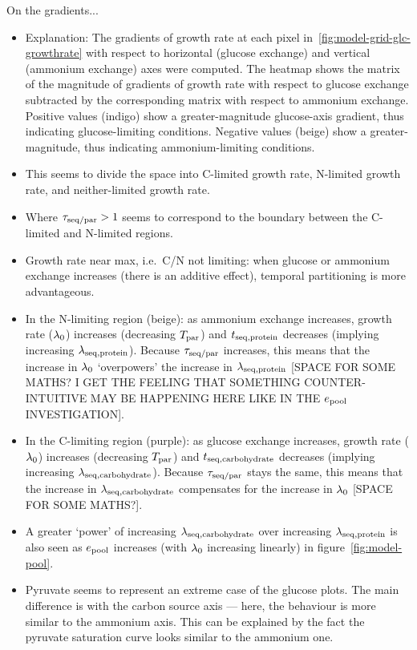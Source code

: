 On the gradients...
\begin{itemize}
  \item Explanation: The gradients of growth rate at each pixel in~\ref{fig:model-grid-glc-growthrate} with respect to horizontal (glucose exchange) and vertical (ammonium exchange) axes were computed.
        The heatmap shows the matrix of the magnitude of gradients of growth rate with respect to glucose exchange subtracted by the corresponding matrix with respect to ammonium exchange.
        Positive values (indigo) show a greater-magnitude glucose-axis gradient, thus indicating glucose-limiting conditions.
        Negative values (beige) show a greater-magnitude, thus indicating ammonium-limiting conditions.
  \item This seems to divide the space into C-limited growth rate, N-limited growth rate, and neither-limited growth rate.
  \item Where $\tau_{\mathrm{seq}/\mathrm{par}} > 1$ seems to correspond to the boundary between the C-limited and N-limited regions.
  \item Growth rate near max, i.e.\ C/N not limiting: when glucose or ammonium exchange increases (there is an additive effect), temporal partitioning is more advantageous.
  \item In the N-limiting region (beige): as ammonium exchange increases, growth rate ($\lambda_{0}$) increases (decreasing $T_{\mathrm{par}}$) and $t_{\mathrm{seq},\mathrm{protein}}$ decreases (implying increasing $\lambda_{\mathrm{seq},\mathrm{protein}}$).
        Because $\tau_{\mathrm{seq}/\mathrm{par}}$ increases, this means that the increase in $\lambda_{0}$ `overpowers' the increase in $\lambda_{\mathrm{seq},\mathrm{protein}}$ [SPACE FOR SOME MATHS?  I GET THE FEELING THAT SOMETHING COUNTER-INTUITIVE MAY BE HAPPENING HERE LIKE IN THE $e_{\mathrm{pool}}$ INVESTIGATION].
  \item In the C-limiting region (purple): as glucose exchange increases, growth rate ($\lambda_{0}$) increases (decreasing $T_{\mathrm{par}}$) and $t_{\mathrm{seq},\mathrm{carbohydrate}}$ decreases (implying increasing $\lambda_{\mathrm{seq},\mathrm{carbohydrate}}$).
        Because $\tau_{\mathrm{seq}/\mathrm{par}}$ stays the same, this means that the increase in $\lambda_{\mathrm{seq},\mathrm{carbohydrate}}$ compensates for the increase in $\lambda_{0}$ [SPACE FOR SOME MATHS?].
  \item A greater `power' of increasing $\lambda_{\mathrm{seq},\mathrm{carbohydrate}}$ over increasing $\lambda_{\mathrm{seq},\mathrm{protein}}$ is also seen as $e_{\mathrm{pool}}$ increases (with $\lambda_{0}$ increasing linearly) in figure~\ref{fig:model-pool}.
  \item Pyruvate seems to represent an extreme case of the glucose plots.
        The main difference is with the carbon source axis --- here, the behaviour is more similar to the ammonium axis.
        This can be explained by the fact the pyruvate saturation curve looks similar to the ammonium one.
\end{itemize}

